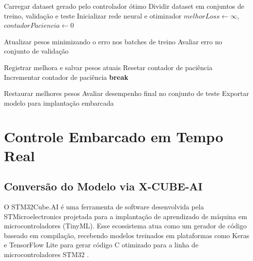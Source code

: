 \begin{algorithm}
\caption{Treinamento da Rede Neural para Aproximação do Controlador}
\label{alg:treino_mlp}
\begin{algorithmic}[1]


    \State Carregar dataset gerado pelo controlador ótimo
    \State Dividir dataset em conjuntos de treino, validação e teste
    \State Inicializar rede neural e otimizador
    \State $melhorLoss \gets \infty$, \quad $contadorPaciencia \gets 0$

    \Statex
        \State Atualizar pesos minimizando o erro nos batches de treino
        \State Avaliar erro no conjunto de validação

            \State Registrar melhora e salvar pesos atuais
            \State Resetar contador de paciência
        \Else
            \State Incrementar contador de paciência
                \State \textbf{break} 
            \EndIf
        \EndIf
    \EndFor

    \Statex
    \State Restaurar melhores pesos
    \State Avaliar desempenho final no conjunto de teste
    \State Exportar modelo para implantação embarcada

\EndProcedure
\end{algorithmic}
\end{algorithm}


\section{Controle Embarcado em Tempo Real}

\subsection{Conversão do Modelo via X-CUBE-AI}

O STM32Cube.AI é uma ferramenta de software desenvolvida pela STMicroelectronics projetada para a implantação de aprendizado de máquina em microcontroladores (TinyML). Esse ecossistema atua como um gerador de código baseado em compilação, recebendo modelos treinados em plataformas como Keras e TensorFlow Lite para gerar código C otimizado para a linha de microcontroladores STM32 \cite{stmu2526}.

